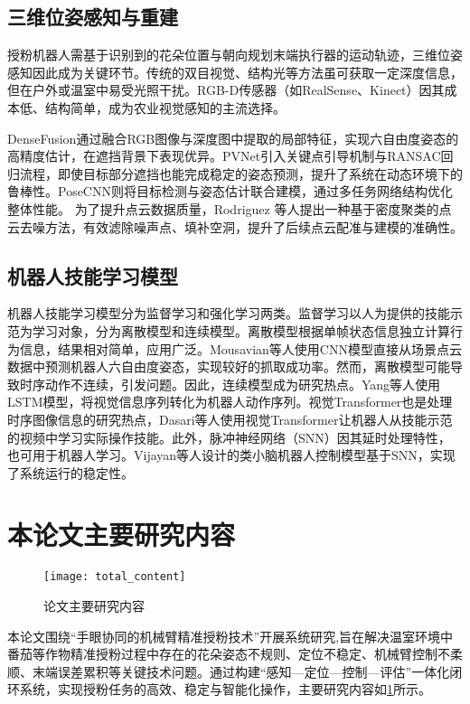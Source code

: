 \subsection{三维位姿感知与重建} 
授粉机器人需基于识别到的花朵位置与朝向规划末端执行器的运动轨迹，三维位姿感知因此成为关键环节。传统的双目视觉、结构光等方法虽可获取一定深度信息，但在户外或温室中易受光照干扰。RGB-D传感器（如RealSense、Kinect）因其成本低、结构简单，成为农业视觉感知的主流选择。

DenseFusion\cite{wang2019densefusion}通过融合RGB图像与深度图中提取的局部特征，实现六自由度姿态的高精度估计，在遮挡背景下表现优异。PVNet\cite{peng2019pvnet}引入关键点引导机制与RANSAC回归流程，即使目标部分遮挡也能完成稳定的姿态预测，提升了系统在动态环境下的鲁棒性。PoseCNN\cite{xiang2017posecnn}则将目标检测与姿态估计联合建模，通过多任务网络结构优化整体性能。
为了提升点云数据质量，Rodriguez 等人\cite{rodriguez2014clustering}提出一种基于密度聚类的点云去噪方法，有效滤除噪声点、填补空洞，提升了后续点云配准与建模的准确性。

\subsection{机器人技能学习模型}
机器人技能学习模型分为监督学习\cite{cunningham2008supervised}和强化学习\cite{wiering2012reinforcement}两类。监督学习以人为提供的技能示范为学习对象，分为离散模型和连续模型。离散模型根据单帧状态信息独立计算行为信息，结果相对简单，应用广泛。Mousavian等人\cite{mousavian20196}使用CNN模型直接从场景点云数据中预测机器人六自由度姿态，实现较好的抓取成功率。然而，离散模型可能导致时序动作不连续，引发问题。因此，连续模型成为研究热点。Yang等人\cite{yang2019learning}使用LSTM模型，将视觉信息序列转化为机器人动作序列。视觉Transformer也是处理时序图像信息的研究热点，Dasari等人\cite{dasari2021transformers}使用视觉Transformer让机器人从技能示范的视频中学习实际操作技能。此外，脉冲神经网络\cite{kabilan2021neuromorphic}（SNN）因其延时处理特性，也可用于机器人学习。Vijayan等人\cite{vijayan2022cerebellum}设计的类小脑机器人控制模型基于SNN，实现了系统运行的稳定性。


\section{本论文主要研究内容}
\begin{figure}[htb]
	\texttt{[image: total\_content]}
	\caption[论文主要研究内容]{论文主要研究内容} %
	\label{fig:total_content}
\end{figure}
本论文围绕“手眼协同的机械臂精准授粉技术”开展系统研究,旨在解决温室环境中番茄等作物精准授粉过程中存在的花朵姿态不规则、定位不稳定、机械臂控制不柔顺、末端误差累积等关键技术问题。通过构建“感知—定位—控制—评估”一体化闭环系统，实现授粉任务的高效、稳定与智能化操作，主要研究内容如\cref{fig:total_content}所示。

